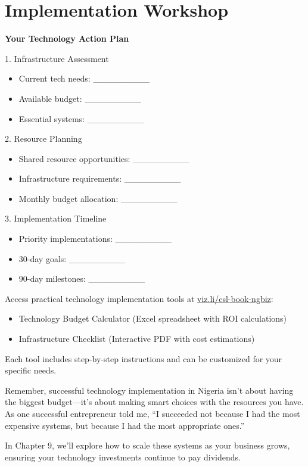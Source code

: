\section{Implementation Workshop}\label{sec:implementation-workshop}

\begin{workshopbox}
\textbf{Your Technology Action Plan}

1. Infrastructure Assessment
\begin{itemize}
    \item Current tech needs: \_\_\_\_\_\_\_\_\_
    \item Available budget: \_\_\_\_\_\_\_\_\_
    \item Essential systems: \_\_\_\_\_\_\_\_\_
\end{itemize}

2. Resource Planning
\begin{itemize}
    \item Shared resource opportunities: \_\_\_\_\_\_\_\_\_
    \item Infrastructure requirements: \_\_\_\_\_\_\_\_\_
    \item Monthly budget allocation: \_\_\_\_\_\_\_\_\_
\end{itemize}

3. Implementation Timeline
\begin{itemize}
    \item Priority implementations: \_\_\_\_\_\_\_\_\_
    \item 30-day goals: \_\_\_\_\_\_\_\_\_
    \item 90-day milestones: \_\_\_\_\_\_\_\_\_
\end{itemize}
\end{workshopbox}

\begin{communitybox}
Access practical technology implementation tools at \href{https://viz.li/csl-book-ngbiz}{viz.li/csl-book-ngbiz}:
\begin{itemize}
    \item Technology Budget Calculator (Excel spreadsheet with ROI calculations)
    \item Infrastructure Checklist (Interactive PDF with cost estimations)
\end{itemize}
Each tool includes step-by-step instructions and can be customized for your specific needs.
\end{communitybox}

\begin{importantbox}
Remember, successful technology implementation in Nigeria isn't about having the biggest budget—it's about making smart choices with the resources you have. As one successful entrepreneur told me, ``I succeeded not because I had the most expensive systems, but because I had the most appropriate ones.''

In Chapter 9, we'll explore how to scale these systems as your business grows, ensuring your technology investments continue to pay dividends.
\end{importantbox}